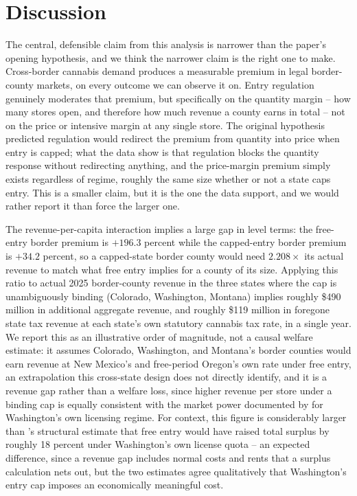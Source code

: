 \documentclass[12pt]{article}
\begin{document}
\section{Discussion}
\label{sec:discussion}

The central, defensible claim from this analysis is narrower than the paper's opening hypothesis, and we think
the narrower claim is the right one to make. Cross-border cannabis demand produces a measurable premium in
legal border-county markets, on every outcome we can observe it on. Entry regulation genuinely moderates that
premium, but specifically on the quantity margin -- how many stores open, and therefore how much revenue a
county earns in total -- not on the price or intensive margin at any single store. The original hypothesis
predicted regulation would redirect the premium from quantity into price when entry is capped; what the data
show is that regulation blocks the quantity response without redirecting anything, and the price-margin premium
simply exists regardless of regime, roughly the same size whether or not a state caps entry. This is a smaller
claim, but it is the one the data support, and we would rather report it than force the larger one.

\label{sec:magnitude}
The revenue-per-capita interaction implies a large gap in level terms: the free-entry border premium is
$+196.3$ percent while the capped-entry border premium is $+34.2$ percent, so a capped-state border county
would need $2.208\times$ its actual revenue to match what free entry implies for a county of its size.
Applying this ratio to actual 2025 border-county revenue in the three states where the cap is unambiguously
binding (Colorado, Washington, Montana) implies roughly \$490 million in additional aggregate revenue, and
roughly \$119 million in foregone state tax revenue at each state's own statutory cannabis tax rate, in a
single year. We report this as an illustrative order of magnitude, not a causal welfare estimate: it assumes
Colorado, Washington, and Montana's border counties would earn revenue at New Mexico's and free-period
Oregon's own rate under free entry, an extrapolation this cross-state design does not directly identify, and
it is a revenue gap rather than a welfare loss, since higher revenue per store under a binding cap is equally
consistent with the market power documented by \citet{HollenbeckUetake2021} for Washington's own licensing
regime. For context, this figure is considerably larger than \citet{Thomas2019LicenseQuotas}'s structural
estimate that free entry would have raised total surplus by roughly 18 percent under Washington's own license
quota -- an expected difference, since a revenue gap includes normal costs and rents that a surplus
calculation nets out, but the two estimates agree qualitatively that Washington's entry cap imposes an
economically meaningful cost.
\end{document}
